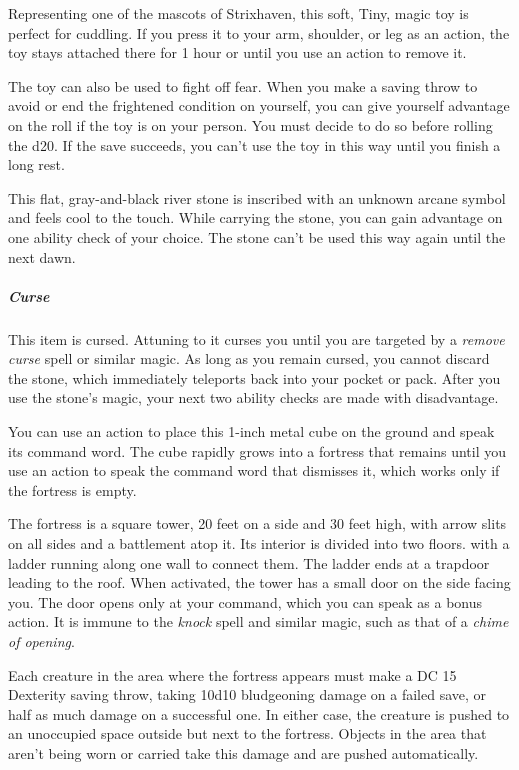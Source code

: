 \documentclass[10pt,a4paper,twoside,bg=print,twocolumn,openany,nodeprecatedcode]{dndbook}
\begin{document}
Representing one of the mascots of Strixhaven, this soft, Tiny, magic toy is perfect for cuddling. If you press it to your arm, shoulder, or leg as an action, the toy stays attached there for 1 hour or until you use an action to remove it.

The toy can also be used to fight off fear. When you make a saving throw to avoid or end the frightened condition on yourself, you can give yourself advantage on the roll if the toy is on your person. You must decide to do so before rolling the d20. If the save succeeds, you can't use the toy in this way until you finish a long rest.

This flat, gray-and-black river stone is inscribed with an unknown arcane symbol and feels cool to the touch. While carrying the stone, you can gain advantage on one ability check of your choice. The stone can't be used this way again until the next dawn.

\subparagraph{Curse}
This item is cursed. Attuning to it curses you until you are targeted by a \textit{remove curse} spell or similar magic. As long as you remain cursed, you cannot discard the stone, which immediately teleports back into your pocket or pack. After you use the stone's magic, your next two ability checks are made with disadvantage.

You can use an action to place this 1-inch metal cube on the ground and speak its command word. The cube rapidly grows into a fortress that remains until you use an action to speak the command word that dismisses it, which works only if the fortress is empty.

The fortress is a square tower, 20 feet on a side and 30 feet high, with arrow slits on all sides and a battlement atop it. Its interior is divided into two floors. with a ladder running along one wall to connect them. The ladder ends at a trapdoor leading to the roof. When activated, the tower has a small door on the side facing you. The door opens only at your command, which you can speak as a bonus action. It is immune to the \textit{knock} spell and similar magic, such as that of a \textit{chime of opening}.

Each creature in the area where the fortress appears must make a DC 15 Dexterity saving throw, taking 10d10 bludgeoning damage on a failed save, or half as much damage on a successful one. In either case, the creature is pushed to an unoccupied space outside but next to the fortress. Objects in the area that aren't being worn or carried take this damage and are pushed automatically.
\end{document}
